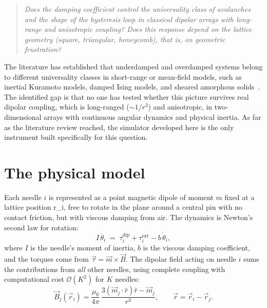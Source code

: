\documentclass[11pt,a4paper]{article}
\begin{document}
\begin{quote}\itshape
Does the damping coefficient control the universality class of avalanches and the shape of the hysteresis loop in classical dipolar arrays with long-range and anisotropic coupling? Does this response depend on the lattice geometry (square, triangular, honeycomb), that is, on geometric frustration?
\end{quote}

The literature has established that underdamped and overdamped systems belong to different universality classes in short-range or mean-field models, such as inertial Kuramoto models, damped Ising models, and sheared amorphous solids~\cite{dahmen2011}. The identified gap is that no one has tested whether this picture survives real dipolar coupling, which is long-ranged ($\sim 1/r^3$) and anisotropic, in two-dimensional arrays with continuous angular dynamics and physical inertia. As far as the literature review reached, the simulator developed here is the only instrument built specifically for this question.

\section{The physical model}

Each needle $i$ is represented as a point magnetic dipole of moment $m$ fixed at a lattice position \vec r_i, free to rotate in the plane around a central pin with no contact friction, but with viscous damping from air. The dynamics is Newton's second law for rotation:
\begin{equation}
I\,\ddot\theta_i \;=\; \tau_i^{\mathrm{dip}} + \tau_i^{\mathrm{ext}}
- b\,\dot\theta_i,
\label{eq:eom}
\end{equation}
where $I$ is the needle's moment of inertia, $b$ is the viscous damping coefficient, and the torques come from $\vec\tau = \vec m \times \vec B$. The dipolar field acting on needle $i$ sums the contributions from \emph{all} other needles, using complete coupling with computational cost $\mathcal{O}(K^2)$ for $K$ needles:
\begin{equation}
\vec B_j(\vec r_i) = \frac{\mu_0}{4\pi}\,
\frac{3(\vec m_j \cdot \hat r)\hat r - \vec m_j}{r^3},
\qquad \vec r = \vec r_i - \vec r_j .
\end{equation}
\end{document}
